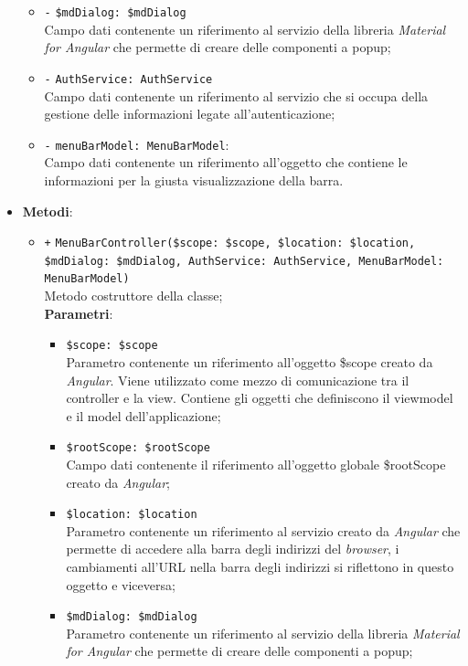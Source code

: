 \begin{itemize}
\begin{itemize}
		\item \texttt{-} \texttt{\$mdDialog: \$mdDialog} \\
		Campo dati contenente un riferimento al servizio della libreria \textit{Material for Angular} che permette di creare delle componenti a popup;
		\item \texttt{-} \texttt{AuthService: AuthService} \\
		Campo dati contenente un riferimento al servizio che si occupa della gestione delle informazioni legate all’autenticazione;
		\item \texttt{-} \texttt{menuBarModel: MenuBarModel}: \\
		Campo dati contenente un riferimento all'oggetto che contiene le informazioni per la giusta visualizzazione della barra.
	\end{itemize}
	\item \textbf{Metodi}:
	\begin{itemize}
		\item \texttt{+} \texttt{MenuBarController(\$scope: \$scope, \$location: \$location, \$mdDialog: \$mdDialog, AuthService: AuthService, MenuBarModel: MenuBarModel)} \\
		Metodo costruttore della classe; \\
		\textbf{Parametri}:
		\begin{itemize}
			\item \texttt{\$scope: \$scope} \\
			Parametro contenente un riferimento all’oggetto \$scope creato da \textit{Angular}. Viene utilizzato come mezzo di comunicazione tra il controller e la view. Contiene gli oggetti che definiscono il viewmodel e il model dell’applicazione;
			\item \texttt{\$rootScope: \$rootScope} \\
			Campo dati contenente il riferimento all'oggetto globale \$rootScope creato da \textit{Angular};
			\item \texttt{\$location: \$location} \\
			Parametro contenente un riferimento al servizio creato da \textit{Angular} che permette di accedere alla barra degli indirizzi del \textit{browser}, i cambiamenti all’URL nella barra degli indirizzi si riflettono in questo oggetto e viceversa;
			\item \texttt{\$mdDialog: \$mdDialog} \\
			Parametro contenente un riferimento al servizio della libreria \textit{Material for Angular} che permette di creare delle componenti a popup;

\end{itemize}
\end{itemize}
\end{itemize}

